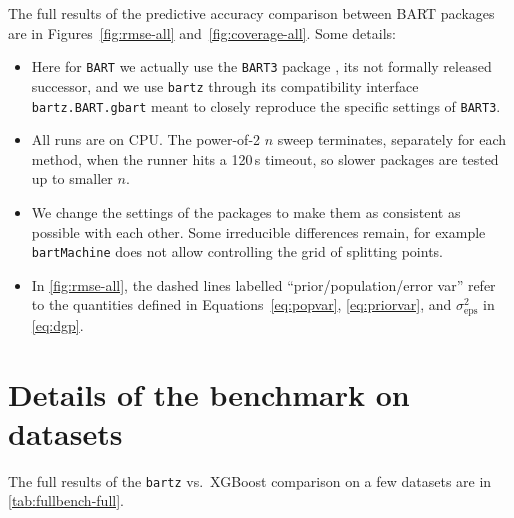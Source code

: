\documentclass{article}
\newcommand{\widecenter}[1]{\noindent\hspace{-\textwidth}\makebox[3\textwidth][c]{#1}}
\begin{document}
The full results of the predictive accuracy comparison between BART packages
are in Figures~\ref{fig:rmse-all} and~\ref{fig:coverage-all}. Some details:
%
\begin{itemize}

	\item Here for \texttt{BART} we actually use the \texttt{BART3} package
		\autocite{mcculloch2025}, its not formally released successor,
		and we use \texttt{bartz} through its compatibility interface
		\texttt{bartz.BART.gbart} meant to closely reproduce the
		specific settings of \texttt{BART3}.
	
	\item All runs are on CPU. The power-of-2 $n$ sweep terminates,
		separately for each method, when the runner hits a 120\,s
		timeout, so slower packages are tested up to smaller $n$.
	
	\item We change the settings of the packages to make them as consistent
		as possible with each other. Some irreducible differences
		remain, for example \texttt{bartMachine} does not allow
		controlling the grid of splitting points.
	
	\item In \autoref{fig:rmse-all}, the dashed lines labelled
		``prior/population/error var'' refer to the quantities defined
		in Equations~\ref{eq:popvar}, \ref{eq:priorvar}, and
		$\sigma^2_\text{eps}$ in \autoref{eq:dgp}.

\end{itemize}

\section{Details of the benchmark on datasets}
\label{sec:fulldetails}

The full results of the \texttt{bartz} vs.\ XGBoost comparison on a few
datasets are in \autoref{tab:fullbench-full}.

\begin{table}
	\centering
	\caption{\label{tab:fullbench-full} Extended version of
		\autoref{tab:fullbench}. Comparison of \texttt{bartz} against
		XGBoost on various large datasets, at near-default
		settings, on an Nvidia RTX PRO 5000 GPU. Each run is repeated 5
		times over different train/test splits and with different
	random seeds. The standard deviation across repetitions is reported as
a digit in parentheses when non-zero. See \autoref{sec:fulldetails} for
details.}
	\footnotesize\sffamily
	\renewcommand{\arraystretch}{0.97}
	\setlength{\tabcolsep}{3pt}
	\widecenter{}
\end{table}
\end{document}
